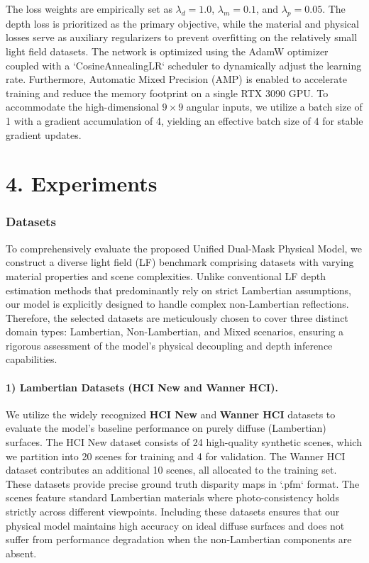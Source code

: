 \documentclass[lettersize,journal]{IEEEtran}
\begin{document}
The loss weights are empirically set as $\lambda_{d} = 1.0$, $\lambda_{m} = 0.1$, and $\lambda_{p} = 0.05$. The depth loss is prioritized as the primary objective, while the material and physical losses serve as auxiliary regularizers to prevent overfitting on the relatively small light field datasets. The network is optimized using the AdamW optimizer coupled with a `CosineAnnealingLR` scheduler to dynamically adjust the learning rate. Furthermore, Automatic Mixed Precision (AMP) is enabled to accelerate training and reduce the memory footprint on a single RTX 3090 GPU. To accommodate the high-dimensional $9 \times 9$ angular inputs, we utilize a batch size of 1 with a gradient accumulation of 4, yielding an effective batch size of 4 for stable gradient updates.


\section{4. Experiments}

\subsubsection{Datasets}

To comprehensively evaluate the proposed Unified Dual-Mask Physical Model, we construct a diverse light field (LF) benchmark comprising datasets with varying material properties and scene complexities. Unlike conventional LF depth estimation methods that predominantly rely on strict Lambertian assumptions, our model is explicitly designed to handle complex non-Lambertian reflections. Therefore, the selected datasets are meticulously chosen to cover three distinct domain types: Lambertian, Non-Lambertian, and Mixed scenarios, ensuring a rigorous assessment of the model's physical decoupling and depth inference capabilities.

\paragraph{1) Lambertian Datasets (HCI New and Wanner HCI).}
We utilize the widely recognized \textbf{HCI New} and \textbf{Wanner HCI} datasets to evaluate the model's baseline performance on purely diffuse (Lambertian) surfaces. The HCI New dataset consists of 24 high-quality synthetic scenes, which we partition into 20 scenes for training and 4 for validation. The Wanner HCI dataset contributes an additional 10 scenes, all allocated to the training set. These datasets provide precise ground truth disparity maps in `.pfm` format. The scenes feature standard Lambertian materials where photo-consistency holds strictly across different viewpoints. Including these datasets ensures that our physical model maintains high accuracy on ideal diffuse surfaces and does not suffer from performance degradation when the non-Lambertian components are absent.
\end{document}

